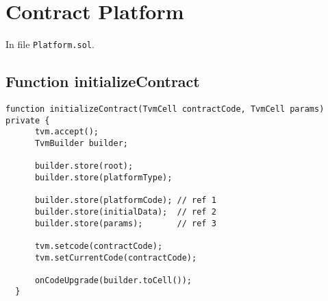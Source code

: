 
\bigskip

\section{Contract Platform}

In file {\tt Platform.sol}.

\subsection{Function initializeContract}

\begin{lstlisting}[firstnumber=18]
  function initializeContract(TvmCell contractCode, TvmCell params) private {
      tvm.accept();
      TvmBuilder builder;

      builder.store(root);
      builder.store(platformType);

      builder.store(platformCode); // ref 1
      builder.store(initialData);  // ref 2
      builder.store(params);       // ref 3

      tvm.setcode(contractCode);
      tvm.setCurrentCode(contractCode);

      onCodeUpgrade(builder.toCell());
  }
\end{lstlisting}

